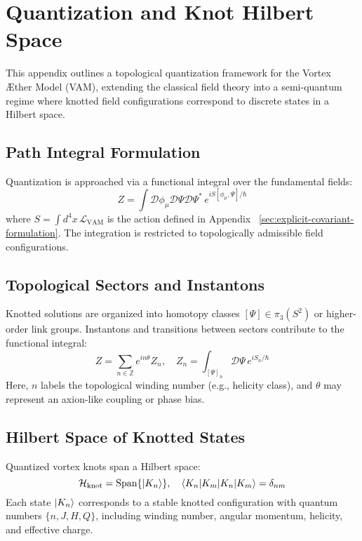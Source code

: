     \section{Quantization and Knot Hilbert Space}
    This appendix outlines a topological quantization framework for the Vortex Æther Model (VAM), extending the classical field theory into a semi-quantum regime where knotted field configurations correspond to discrete states in a Hilbert space.

    \subsection{Path Integral Formulation}
    Quantization is approached via a functional integral over the fundamental fields:
    \begin{equation}
        Z = \int \mathcal{D}\phi_\mu \mathcal{D}\Psi \mathcal{D}\Psi^* \, e^{i S[\phi_\mu, \Psi] / \hbar}
    \end{equation}
    where $S = \int d^4x \, \mathcal{L}_{\text{VAM}}$ is the action defined in Appendix ~\ref{sec:explicit-covariant-formulation}. The integration is restricted to topologically admissible field configurations.

    \subsection{Topological Sectors and Instantons}
    Knotted solutions are organized into homotopy classes $[\Psi] \in \pi_3(S^2)$ or higher-order link groups. Instantons and transitions between sectors contribute to the functional integral:
    \begin{equation}
        Z = \sum_{n \in \mathbb{Z}} e^{i n \theta} Z_n, \quad Z_n = \int_{[\Psi]_n} \mathcal{D} \Psi \, e^{i S_n / \hbar}
    \end{equation}
    Here, $n$ labels the topological winding number (e.g., helicity class), and $\theta$ may represent an axion-like coupling or phase bias.

    \subsection{Hilbert Space of Knotted States}
    Quantized vortex knots span a Hilbert space:
    \begin{equation}
        \mathcal{H}_{\text{knot}} = \text{Span} \{ \ket{K_n} \}, \quad \braket{K_n | K_m} = \delta_{nm}
    \end{equation}
    Each state $\ket{K_n}$ corresponds to a stable knotted configuration with quantum numbers $\{ n, J, H, Q \}$, including winding number, angular momentum, helicity, and effective charge.

